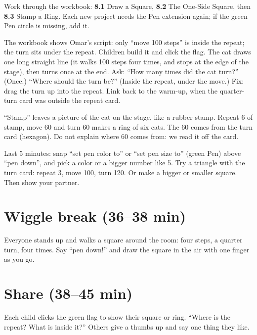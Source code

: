 Work through the workbook: \textbf{8.1} Draw a Square, \textbf{8.2} The One-Side Square, then \textbf{8.3} Stamp a Ring. Each new project needs the Pen extension again; if the green Pen circle is missing, add it.

\begin{bughunt}
The workbook shows Omar's script: only \enquote{move 100 steps} is inside the repeat; the turn sits under the repeat. Children build it and click the flag. The cat draws one long straight line (it walks 100 steps four times, and stops at the edge of the stage), then turns once at the end. Ask: \enquote{How many times did the cat turn?} (Once.) \enquote{Where should the turn be?} (Inside the repeat, under the move.) Fix: drag the turn up into the repeat. Link back to the warm-up, when the quarter-turn card was outside the repeat card.
\end{bughunt}

\begin{tip}
\enquote{Stamp} leaves a picture of the cat on the stage, like a rubber stamp. Repeat 6 of stamp, move 60 and turn 60 makes a ring of six cats. The 60 comes from the turn card (hexagon). Do not explain where 60 comes from: we read it off the card.
\end{tip}

\begin{freebuild}
Last 5 minutes: snap \enquote{set pen color to} or \enquote{set pen size to} (green Pen) above \enquote{pen down}, and pick a color or a bigger number like 5. Try a triangle with the turn card: repeat 3, move 100, turn 120. Or make a bigger or smaller square. Then show your partner.
\end{freebuild}

\section{Wiggle break (36--38 min)}
Everyone stands up and walks a square around the room: four steps, a quarter turn, four times. Say \enquote{pen down!} and draw the square in the air with one finger as you go.

\section{Share (38--45 min)}
\begin{teacherscript}
Each child clicks the green flag to show their square or ring. \enquote{Where is the repeat? What is inside it?} Others give a thumbs up and say one thing they like.
\end{teacherscript}

